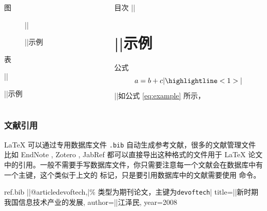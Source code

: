 \begin{shadedsection}
\begin{frame}[fragile]
  \begin{columns}
    \begin{column}{0.5\textwidth}
      \begin{codeblock}[]{图}
\begin{figure}
||  \caption{|\phantom{}|示例}\label{fig:example}
\end{figure}
      \end{codeblock}
      \begin{codeblock}[]{表}
\begin{table}
||  \caption{|\phantom{}|示例}\label{tab:example}
\end{table}
      \end{codeblock}
    \end{column}
    \begin{column}{0.5\textwidth}
\begin{codeblock}[]{目次}
||\section{|\phantom{}|示例}\label{sec:example}
\end{codeblock}

\begin{codeblock}[]{公式}
\begin{equation}
  a = b + c
|\highlightline<1>|\label{eq:example}
\end{equation}
||如公式 \eqref{eq:example} 所示，
\end{codeblock}
    \end{column}
  \end{columns}
\end{frame}

\begin{frame}[fragile]
  \frametitle{文献引用}
  \LaTeX{} 可以通过专用数据库文件 \texttt{.bib} 自动生成参考文献，很多的文献管理文件比如 EndNote , Zotero , JabRef  都可以直接导出这种格式的文件用于 \LaTeX{} 论文中的引用。一般不需要手写数据库文件，你只需要注意每一个文献会在数据库中有一个主键，这个类似于上文的  标记，只是要引用数据库中的文献需要使用  命令。

  \begin{codeblock}[]{ref.bib}
|\highlightline|@article{devoftech,|\hfill\alert{\% 类型为期刊论文，主键为\texttt{devoftech}}|
  title={|\phantom{}|新时期我国信息技术产业的发展},
  author={|\phantom{}|江泽民},
  year={2008}
}
  \end{codeblock}
\end{frame}


\end{shadedsection}

